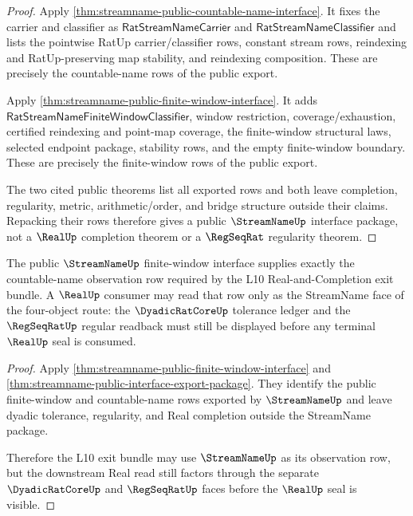 \begin{proof}
Apply \autoref{thm:streamname-public-countable-name-interface}.  It fixes the
carrier and classifier as $\mathsf{RatStreamNameCarrier}$ and
$\mathsf{RatStreamNameClassifier}$ and lists the pointwise RatUp
carrier/classifier rows, constant stream rows, reindexing and RatUp-preserving
map stability, and reindexing composition.  These are precisely the
countable-name rows of the public export.

Apply \autoref{thm:streamname-public-finite-window-interface}.  It adds
$\mathsf{RatStreamNameFiniteWindowClassifier}$, window restriction,
coverage/exhaustion, certified reindexing and point-map coverage, the
finite-window structural laws, selected endpoint package, stability rows, and
the empty finite-window boundary.  These are precisely the finite-window rows
of the public export.

The two cited public theorems list all exported rows and both leave completion,
regularity, metric, arithmetic/order, and bridge structure outside their
claims.  Repacking their rows therefore gives a public $\StreamNameUp$
interface package, not a $\RealUp$ completion theorem or a $\RegSeqRat$
regularity theorem.
\end{proof}

\begin{theorem}
\label{thm:streamname-public-l10-exit-handoff}
The public $\StreamNameUp$ finite-window interface supplies exactly the countable-name observation row required by the L10 Real-and-Completion exit bundle. A $\RealUp$ consumer may read that row only as the StreamName face of the four-object route: the $\DyadicRatCoreUp$ tolerance ledger and the $\RegSeqRatUp$ regular readback must still be displayed before any terminal $\RealUp$ seal is consumed.
\end{theorem}

\begin{proof}
Apply \autoref{thm:streamname-public-finite-window-interface} and \autoref{thm:streamname-public-interface-export-package}. They identify the public finite-window and countable-name rows exported by $\StreamNameUp$ and leave dyadic tolerance, regularity, and Real completion outside the StreamName package.

Therefore the L10 exit bundle may use $\StreamNameUp$ as its observation row, but the downstream Real read still factors through the separate $\DyadicRatCoreUp$ and $\RegSeqRatUp$ faces before the $\RealUp$ seal is visible.
\end{proof}

